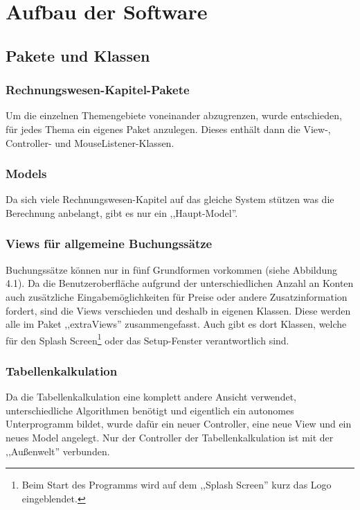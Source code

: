\documentclass[12pt]{report}
\begin{document}
\chapter{Aufbau der Software}
\lhead{\thepage}

\section{Pakete und Klassen} 
  
  

\subsection{Rechnungswesen-Kapitel-Pakete}
Um die einzelnen Themengebiete voneinander abzugrenzen, wurde entschieden, für jedes Thema ein eigenes Paket anzulegen. Dieses enthält dann die View-, Controller- und MouseListener-Klassen.

\subsection{Models}
Da sich viele Rechnungswesen-Kapitel auf das gleiche System stützen was die Berechnung anbelangt, gibt es nur ein ,,Haupt-Model''.
  

  
\subsection{Views für allgemeine Buchungssätze}

Buchungssätze können nur in fünf Grundformen vorkommen (siehe Abbildung 4.1). Da die Benutzeroberfläche aufgrund der unterschiedlichen Anzahl an Konten auch zusätzliche Eingabemöglichkeiten für Preise oder andere Zusatzinformation fordert, sind die Views verschieden und deshalb in eigenen Klassen. 
Diese werden alle im Paket ,,extraViews'' zusammengefasst. Auch gibt es dort Klassen, welche für den Splash Screen\footnote{Beim Start des Programms wird auf dem ,,Splash Screen'' kurz das Logo eingeblendet.} oder das Setup-Fenster verantwortlich sind.

\subsection{Tabellenkalkulation}
Da die Tabellenkalkulation eine komplett andere Ansicht verwendet, unterschiedliche Algorithmen benötigt und eigentlich ein autonomes Unterprogramm bildet, wurde dafür ein neuer Controller, eine neue View und ein neues Model angelegt. Nur der Controller der Tabellenkalkulation ist mit der ,,Außenwelt'' verbunden.
\end{document}

